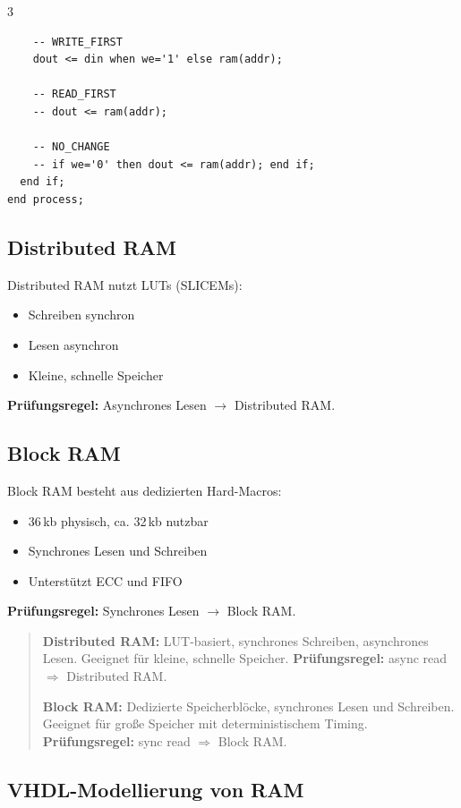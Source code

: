 \documentclass[10pt,a4paper]{article}
\newcommand{\hilite}[1]{\colorbox{yellow!25}{#1}}
\newcommand{\imp}[1]{\textbf{\textcolor{codeemph}{#1}}}
\begin{document}
\begin{multicols}{3}
\begin{lstlisting}
    -- WRITE_FIRST
    dout <= din when we='1' else ram(addr);

    -- READ_FIRST
    -- dout <= ram(addr);

    -- NO_CHANGE
    -- if we='0' then dout <= ram(addr); end if;
  end if;
end process;
\end{lstlisting}


\subsection{Distributed RAM}
Distributed RAM nutzt LUTs (SLICEMs):
\begin{itemize}
  \item Schreiben synchron
  \item Lesen asynchron
  \item Kleine, schnelle Speicher
\end{itemize}

\imp{Prüfungsregel:}  
A\hilite{synchron}es \hilite{Lesen} $\rightarrow$ \hilite{Distributed RAM}.

\subsection{Block RAM}
Block RAM besteht aus dedizierten Hard-Macros:
\begin{itemize}
  \item 36\,kb physisch, ca. 32\,kb nutzbar
  \item Synchrones Lesen und Schreiben
  \item Unterstützt ECC und FIFO
\end{itemize}

\imp{Prüfungsregel:}  
\hilite{Synchrones} \hilite{Lesen} $\rightarrow$ \hilite{Block RAM}.

\begin{quote}\small
\textbf{Distributed RAM:} LUT-basiert, synchrones Schreiben, asynchrones Lesen.
Geeignet für kleine, schnelle Speicher. 
\textbf{Prüfungsregel:} async read $\Rightarrow$ Distributed RAM.

\textbf{Block RAM:} Dedizierte Speicherblöcke, synchrones Lesen und Schreiben.
Geeignet für große Speicher mit deterministischem Timing.
\textbf{Prüfungsregel:} sync read $\Rightarrow$ Block RAM.
\end{quote}


\subsection{VHDL-Modellierung von RAM}


\end{multicols}
\end{document}
